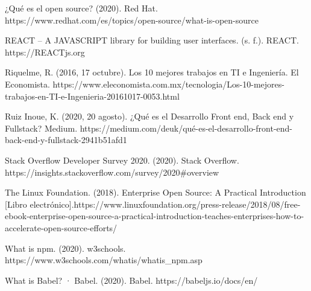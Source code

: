 \begin{thebibliography}{100}
\bibitem{} ¿Qué es el open source? (2020). Red Hat. https://www.redhat.com/es/topics/open-source/what-is-open-source

\bibitem{} REACT – A JAVASCRIPT library for building user interfaces. (s. f.). REACT. https://REACTjs.org

\bibitem{} Riquelme, R. (2016, 17 octubre). Los 10 mejores trabajos en TI e Ingeniería. El Economista. https://www.eleconomista.com.mx/tecnologia/Los-10-mejores-trabajos-en-TI-e-Ingenieria-20161017-0053.html

\bibitem{} Ruiz Inoue, K. (2020, 20 agosto). ¿Qué es el Desarrollo Front end, Back end y Fullstack? Medium. https://medium.com/deuk/qué-es-el-desarrollo-front-end-back-end-y-fullstack-2941b51afd1

\bibitem{} Stack Overflow Developer Survey 2020. (2020). Stack Overflow. https://insights.stackoverflow.com/survey/2020#overview

\bibitem{} The Linux Foundation. (2018). Enterprise Open Source: A Practical Introduction [Libro electrónico].https://www.linuxfoundation.org/press-release/2018/08/free-ebook-enterprise-open-source-a-practical-introduction-teaches-enterprises-how-to-accelerate-open-source-efforts/

\bibitem{} What is npm. (2020). w3schools. https://www.w3schools.com/whatis/whatis_npm.asp

\bibitem{} What is Babel? · Babel. (2020). Babel. https://babeljs.io/docs/en/



\end{thebibliography}